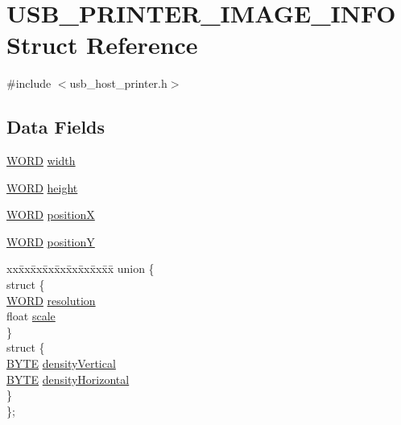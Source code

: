 \hypertarget{struct_u_s_b___p_r_i_n_t_e_r___i_m_a_g_e___i_n_f_o}{}\section{U\+S\+B\+\_\+\+P\+R\+I\+N\+T\+E\+R\+\_\+\+I\+M\+A\+G\+E\+\_\+\+I\+N\+F\+O Struct Reference}
\label{struct_u_s_b___p_r_i_n_t_e_r___i_m_a_g_e___i_n_f_o}


{\ttfamily \#include $<$usb\+\_\+host\+\_\+printer.\+h$>$}

\subsection*{Data Fields}
\begin{DoxyCompactItemize}
\item 
\hyperlink{_generic_type_defs_8h_a2b0e863dadf920709ec53d9088ee7c91}{W\+O\+R\+D} \hyperlink{struct_u_s_b___p_r_i_n_t_e_r___i_m_a_g_e___i_n_f_o_a1fd31a71d8ffffeeacaa6eef4782ee24}{width}
\item 
\hyperlink{_generic_type_defs_8h_a2b0e863dadf920709ec53d9088ee7c91}{W\+O\+R\+D} \hyperlink{struct_u_s_b___p_r_i_n_t_e_r___i_m_a_g_e___i_n_f_o_a919b3b1495d055253ab29ef130f6d9cf}{height}
\item 
\hyperlink{_generic_type_defs_8h_a2b0e863dadf920709ec53d9088ee7c91}{W\+O\+R\+D} \hyperlink{struct_u_s_b___p_r_i_n_t_e_r___i_m_a_g_e___i_n_f_o_a2905f9ed0f9a11f8e9cc8132565e17ed}{position\+X}
\item 
\hyperlink{_generic_type_defs_8h_a2b0e863dadf920709ec53d9088ee7c91}{W\+O\+R\+D} \hyperlink{struct_u_s_b___p_r_i_n_t_e_r___i_m_a_g_e___i_n_f_o_a678d34476dd7781dec4bb363be8d3b1e}{position\+Y}
\item 
\begin{tabbing}
xx\=xx\=xx\=xx\=xx\=xx\=xx\=xx\=xx\=\kill
union \{\\
\>struct \{\\
\>\>\hyperlink{_generic_type_defs_8h_a2b0e863dadf920709ec53d9088ee7c91}{WORD} \hyperlink{struct_u_s_b___p_r_i_n_t_e_r___i_m_a_g_e___i_n_f_o_a76c98c16c00105fdaae5ed2d134c539b}{resolution}\\
\>\>float \hyperlink{struct_u_s_b___p_r_i_n_t_e_r___i_m_a_g_e___i_n_f_o_a1d28dec57cce925ad92342891bd71e7c}{scale}\\
\>\} \\
\>struct \{\\
\>\>\hyperlink{_generic_type_defs_8h_a4ae1dab0fb4b072a66584546209e7d58}{BYTE} \hyperlink{struct_u_s_b___p_r_i_n_t_e_r___i_m_a_g_e___i_n_f_o_a3846900a03e6935affe41beb2786a3d9}{densityVertical}\\
\>\>\hyperlink{_generic_type_defs_8h_a4ae1dab0fb4b072a66584546209e7d58}{BYTE} \hyperlink{struct_u_s_b___p_r_i_n_t_e_r___i_m_a_g_e___i_n_f_o_a833107b4f38d9bf9d5aea1bd84d33ec9}{densityHorizontal}\\
\>\} \\
\}; \\

\end{tabbing}\end{DoxyCompactItemize}


